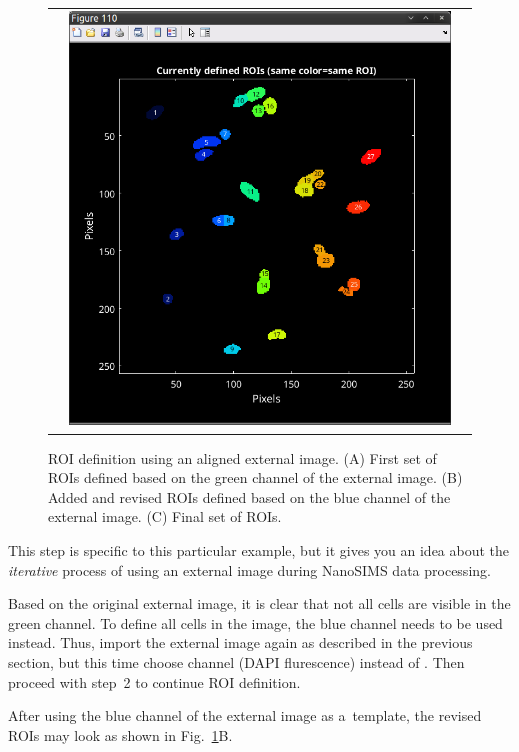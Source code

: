 \begin{figure}[!ht]
\begin{tabular}{ccc}
&
\includegraphics[scale=\scf]{figs7/LANS-ext-ROIs3}
\end{tabular}
\caption{\label{fig:LANS-ext-ROIs}%
ROI definition using an aligned external image. (A) First set of ROIs defined based on the green channel of the external image. (B) Added and revised ROIs defined based on the blue channel of the external image. (C) Final set of ROIs.}
\end{figure}

\goldbox{}
This step is specific to this particular example, but it gives you an idea about the \emph{iterative} process of using an external image during NanoSIMS data processing. 
\tcbe

\s Based on the original external image, it is clear that not all cells are visible in the green channel. To define all cells in the image, the blue channel needs to be used instead. Thus, import the external image again as described in the previous section, but this time choose channel  (DAPI flurescence) instead of . Then proceed with step~2 to continue ROI definition.

\nb\bul After using the blue channel of the external image as a~template, the revised ROIs may look as shown in Fig.~\ref{fig:LANS-ext-ROIs}B.


